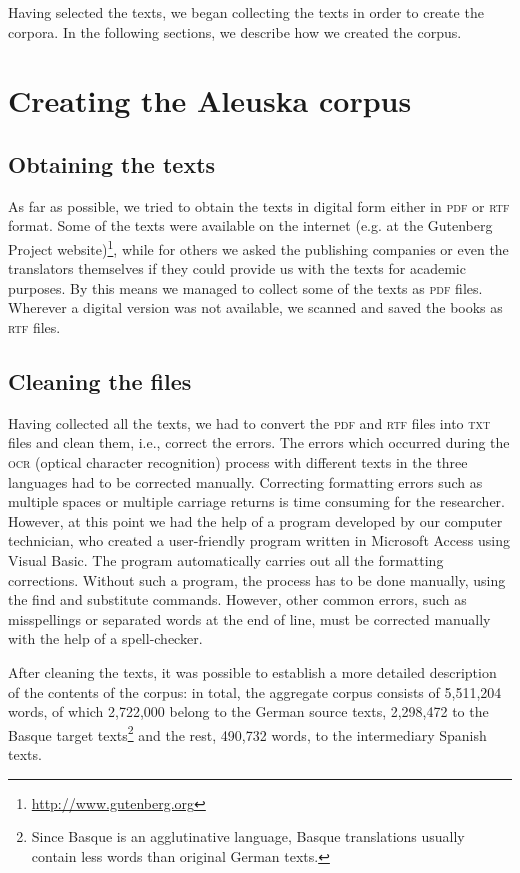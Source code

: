 \documentclass[output=paper]{LSP/langsci}
\begin{document}
Having selected the texts, we began collecting the texts in order to create the corpora. In the following sections, we describe how we created the corpus.

\section{Creating the Aleuska corpus}
\subsection{Obtaining the texts}

As far as possible, we tried to obtain the texts in digital form either in \textsc{pdf} or \textsc{rtf} format. Some of the texts were available on the internet (e.g. at the Gutenberg Project website)\footnote{\url{http://www.gutenberg.org}}, while for others we asked the publishing companies or even the translators themselves if they could provide us with the texts for academic purposes. By this means we managed to collect some of the texts as \textsc{pdf} files. Wherever a digital version was not available, we scanned and saved the books as \textsc{rtf} files.

\subsection{Cleaning the files}

Having collected all the texts, we had to convert the \textsc{pdf} and \textsc{rtf} files into \textsc{txt} files and clean them, i.e., correct the errors. The errors which occurred during the \textsc{ocr} (optical character recognition) process with different texts in the three languages had to be corrected manually. Correcting formatting errors such as multiple spaces or multiple carriage returns is time consuming for the researcher. However, at this point we had the help of a program developed by our computer technician, who created a user-friendly program written in Microsoft Access using Visual Basic. The program automatically carries out all the formatting corrections. Without such a program, the process has to be done manually, using the find and substitute commands. However, other common errors, such as misspellings or separated words at the end of line, must be corrected manually with the help of a spell-checker.

After cleaning the texts, it was possible to establish a more detailed description of the contents of the corpus: in total, the aggregate corpus consists of 5,511,204 words, of which 2,722,000 belong to the German source texts, 2,298,472 to the Basque target texts\footnote{Since Basque is an agglutinative language, Basque translations usually contain less words than original German texts.}  and the rest, 490,732 words, to the intermediary Spanish texts.
\end{document}
